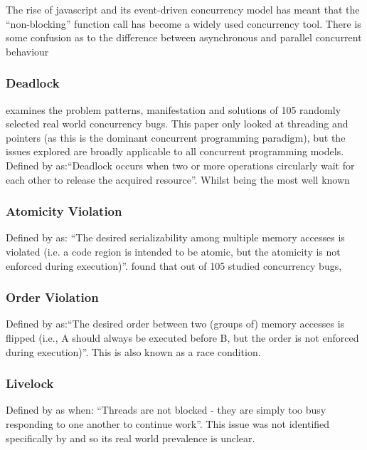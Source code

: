 \documentclass{sig-alternate}
\begin{document}
The rise of javascript and its event-driven concurrency model has meant that the ``non-blocking'' function call has become a widely used concurrency tool. There is some confusion as to the difference between asynchronous and parallel concurrent behaviour

\subsubsection{Deadlock}
\cite{shanlu08:_learn_mistak_compr_study_real} examines the problem patterns, manifestation and solutions of 105 randomly selected real world concurrency bugs. This paper only looked at threading and pointers (as this is the dominant concurrent programming paradigm), but the issues explored are broadly applicable to all concurrent programming models.
Defined by \cite{shanlu08:_learn_mistak_compr_study_real} as:``Deadlock occurs when two or more operations circularly wait for each other to release the acquired resource''. Whilst being the most well known 

\subsubsection{Atomicity Violation}
Defined by \cite{shanlu08:_learn_mistak_compr_study_real} as: ``The desired serializability among multiple memory accesses is violated (i.e. a code region is intended to be atomic, but the atomicity is not enforced during execution)''. \cite{shanlu08:_learn_mistak_compr_study_real} found that out of 105 studied concurrency bugs, 

\subsubsection{Order Violation}
Defined by \cite{shanlu08:_learn_mistak_compr_study_real} as:``The desired order between two (groups of) memory accesses is flipped (i.e., A should always be executed before B, but the order is not enforced during execution)''. This is also known as a race condition. 

\subsubsection{Livelock}
Defined by \cite{oracle:_starv_livel} as when: ``Threads are not blocked - they are simply too busy responding to one another to continue work''. This issue was not identified specifically by \cite{shanlu08:_learn_mistak_compr_study_real} and so its real world prevalence is unclear.
\end{document}
